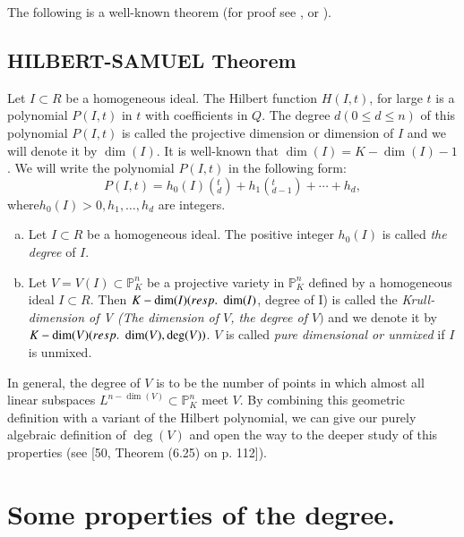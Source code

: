 The following is a well-known theorem (for proof see \cite{26},
  \cite{55} or \cite{72}). 

\subsection{HILBERT-SAMUEL Theorem}\label{chap1:sec3:subsec1.32} 
Let $ I \subset R$ be a homogeneous ideal. The Hilbert function
  $H(I, t)$, for large $t$ is a polynomial $P(I, t)$ in $t$ with
coefficients in $Q$. The degree $d(0
\leq d \leq n)$ of this polynomial $P(I,t)$ is called the 
  projective dimension or dimension of $I$ and we will denote it by
$\dim(I)$. It is well-known that $\dim (I) = K- \dim (I)-1$. We will
write the polynomial $P(I,t)$ in the following form:  
$$
P(I,t)= h_0(I) (^t_d) + h_1(^t_{d-1}) + \cdots + h_d,
$$
where\pageoriginale $h_0(I) > 0, h_1, \ldots, h_d$ are integers.

\setcounter{definition}{32}
\begin{definition}\label{chap1:sec3:def1.33}
  \begin{enumerate}[(a)]
  \item Let $I \subset R$ be a homogeneous ideal. The positive integer
    $h_0 (I)$ is called \textit{the degree} of $I$. 
  \item Let $V = V(I) \subset \mathbb{P}^n_K$ be a projective variety in
    $\mathbb{P}^n_K$ defined by a homogeneous ideal $I \subset R$. Then
    $K-\dim (I) ({resp.}\kern.3em  \dim(I)$, degree of I) is called the \textit{
      Krull-dimension of  V (\resp  The dimension of $V$, the degree of
     $V)$} and we denote it by $K- \dim (V)({resp.}\kern.3em  \dim(V), \deg (V))$. $V$
    is called \textit{ pure dimensional or unmixed} if $I$ is unmixed. 
  \end{enumerate}
\end{definition}

\setcounter{remark}{33}
\begin{remark}\label{chap1:sec3:rem1.34}
 In general, the degree of $V$ is to be the number of points in which
 almost all linear subspaces $L^{n-\dim(V)}\subset \mathbb{P}^n_K$
 meet $V$. By combining this geometric definition with a variant of
 the Hilbert polynomial, we can give our purely algebraic definition
 of $\deg (V)$ and open the way to the deeper study of this properties
 (see [50, Theorem (6.25) on p. 112]).  
\end{remark}

\section*{Some properties of the degree.}

